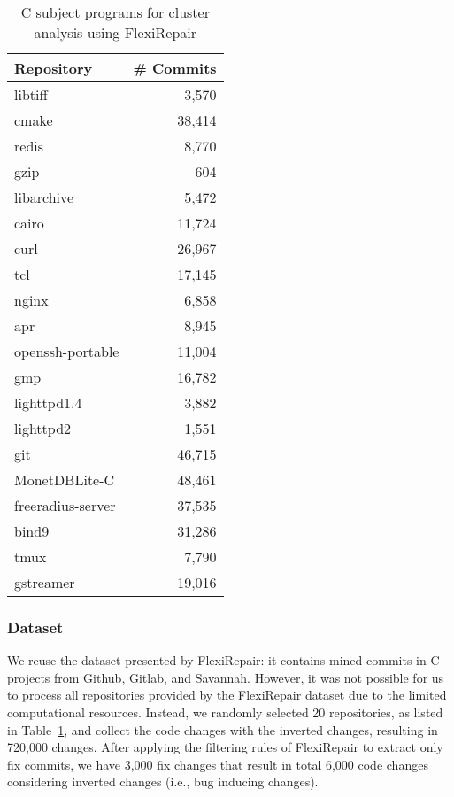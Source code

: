 \documentclass[conference]{IEEEtran}
\begin{document}
\begin{table}[!ht]
    \centering
    \caption{C subject programs for cluster analysis using FlexiRepair}
    \label{tab:RQ1_dataset}
    \begin{tabular}{lr}
        \toprule
        Repository        & \# Commits  \\
        \midrule
        libtiff           & 3,570      \\ 
        cmake             & 38,414     \\ 
        redis             & 8,770      \\ 
        gzip              & 604        \\ 
        libarchive        & 5,472      \\ 
        cairo             & 11,724     \\ 
        curl              & 26,967     \\ 
        tcl               & 17,145     \\ 
        nginx             & 6,858      \\ 
        apr               & 8,945      \\ 
        openssh-portable  & 11,004     \\
        gmp               & 16,782     \\
        lighttpd1.4       & 3,882      \\
        lighttpd2         & 1,551      \\
        git               & 46,715     \\
        MonetDBLite-C     & 48,461     \\
        freeradius-server & 37,535     \\
        bind9             & 31,286     \\
        tmux              & 7,790      \\
        gstreamer         & 19,016     \\
        
        \bottomrule
    \end{tabular}
\end{table}


\subsubsection{Dataset}
We reuse the dataset presented by FlexiRepair: it contains mined commits in C
projects from  Github, Gitlab, and Savannah. However, it was not possible for us
to process all repositories provided by the FlexiRepair dataset due to the
limited computational resources. Instead, we randomly selected 20 repositories,
as listed in Table~\ref{tab:RQ1_dataset}, and collect the code changes with the
inverted changes, resulting in 720,000 changes. After applying the filtering
rules of FlexiRepair to extract only fix commits, we have 3,000 fix changes that
result in total 6,000 code changes considering inverted changes (i.e., bug
inducing changes).
\end{document}
